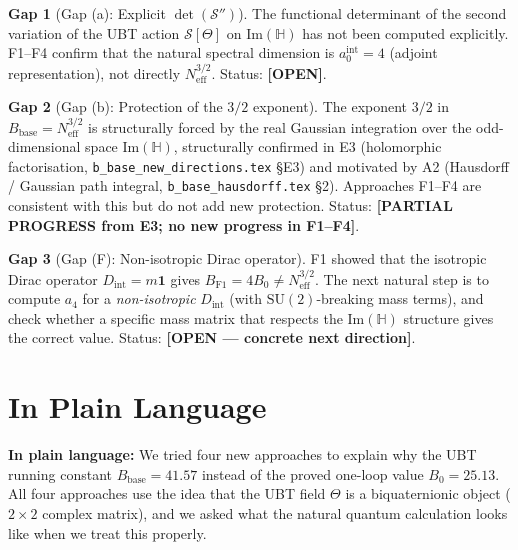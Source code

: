 \documentclass[11pt,a4paper]{article}
\theoremstyle{definition}
\newtheorem{gap}{Gap}
\theoremstyle{remark}
\begin{document}
\begin{gap}[Gap (a): Explicit $\det(\mathcal{S}'')$]
  \label{gap:a}
  The functional determinant of the second variation of the UBT action
  $\mathcal{S}[\Theta]$ on $\mathrm{Im}(\mathbb{H})$ has not been computed
  explicitly.
  F1--F4 confirm that the natural spectral dimension is $a_0^{\mathrm{int}} = 4$
  (adjoint representation), not directly $N_{\mathrm{eff}}^{3/2}$.
  Status: \textbf{[OPEN]}.
\end{gap}

\begin{gap}[Gap (b): Protection of the $3/2$ exponent]
  \label{gap:b}
  The exponent $3/2$ in $B_{\mathrm{base}} = N_{\mathrm{eff}}^{3/2}$ is
  structurally forced by the real Gaussian integration over the odd-dimensional
  space $\mathrm{Im}(\mathbb{H})$, structurally confirmed in E3
  (holomorphic factorisation, \texttt{b\_base\_new\_directions.tex} §E3)
  and motivated by A2 (Hausdorff / Gaussian path integral,
  \texttt{b\_base\_hausdorff.tex} §2).
  Approaches F1--F4 are consistent with this but do not add new protection.
  Status: \textbf{[PARTIAL PROGRESS from E3; no new progress in F1--F4]}.
\end{gap}

\begin{gap}[Gap (F): Non-isotropic Dirac operator]
  \label{gap:F}
  F1 showed that the isotropic Dirac operator $D_{\mathrm{int}} = m\mathbf{1}$
  gives $B_{\mathrm{F1}} = 4B_0 \neq N_{\mathrm{eff}}^{3/2}$.
  The next natural step is to compute $a_4$ for a \emph{non-isotropic}
  $D_{\mathrm{int}}$ (with $\mathrm{SU}(2)$-breaking mass terms), and check
  whether a specific mass matrix that respects the $\mathrm{Im}(\mathbb{H})$
  structure gives the correct value.
  Status: \textbf{[OPEN — concrete next direction]}.
\end{gap}

\section{In Plain Language}
\label{sec:plain}

\textbf{In plain language:}
We tried four new approaches to explain why the UBT running constant
$B_{\mathrm{base}} = 41.57$ instead of the proved one-loop value $B_0 = 25.13$.
All four approaches use the idea that the UBT field $\Theta$ is a biquaternionic
object ($2 \times 2$ complex matrix), and we asked what the natural quantum
calculation looks like when we treat this properly.
\end{document}
